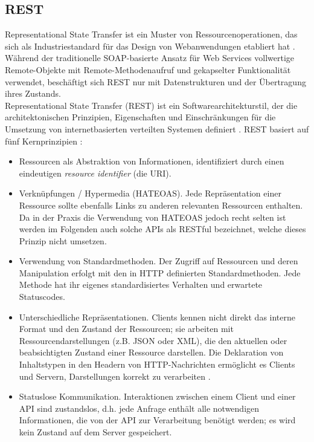 \subsection{REST}

Representational State Transfer ist ein Muster von Ressourcenoperationen, das sich als Industriestandard für das Design von Webanwendungen etabliert hat \parencite[2]{battle2008bridging}. Während der traditionelle SOAP-basierte Ansatz für Web Services vollwertige Remote-Objekte mit Remote-Methodenaufruf und gekapselter Funktionalität verwendet, beschäftigt sich REST nur mit Datenstrukturen und der Übertragung ihres Zustands. \\

Representational State Transfer (REST) ist ein Softwarearchitekturstil, der die architektonischen Prinzipien, Eigenschaften und Einschränkungen für die Umsetzung von internetbasierten verteilten Systemen definiert \parencite[86]{fielding2000architectural}. REST basiert auf fünf Kernprinzipien \parencite[11]{tilkov2015rest}:

\begin{itemize}
	\item Ressourcen als Abstraktion von Informationen, identifiziert durch einen eindeutigen \emph{resource identifier} (die URI).
	\item Verknüpfungen / Hypermedia (HATEOAS). Jede Repräsentation einer Ressource sollte ebenfalls Links zu anderen relevanten Ressourcen enthalten. Da in der Praxis die Verwendung von HATEOAS jedoch recht selten ist \parencite[35--36]{rodriguez2016rest} werden im Folgenden auch solche APIs als RESTful bezeichnet, welche dieses Prinzip nicht umsetzen.
	\item Verwendung von Standardmethoden. Der Zugriff auf Ressourcen und deren Manipulation erfolgt mit den in HTTP definierten Standardmethoden. Jede Methode hat ihr eigenes standardisiertes Verhalten und erwartete Statuscodes.
	\item Unterschiedliche Repräsentationen. Clients kennen nicht direkt das interne Format und den Zustand der Ressourcen; sie arbeiten mit Ressourcendarstellungen (z.B. JSON oder XML), die den aktuellen oder beabsichtigten Zustand einer Ressource darstellen. Die Deklaration von Inhaltstypen in den Headern von HTTP-Nachrichten ermöglicht es Clients und Servern, Darstellungen korrekt zu verarbeiten \parencite[23]{rodriguez2016rest}.
	\item Statuslose Kommunikation. Interaktionen zwischen einem Client und einer API sind zustandslos, d.h. jede Anfrage enthält alle notwendigen Informationen, die von der API zur Verarbeitung benötigt werden; es wird kein Zustand auf dem Server gespeichert.
\end{itemize}

